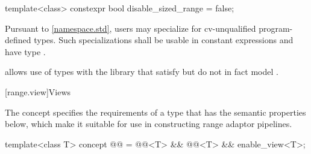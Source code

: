 %
\begin{itemdecl}
template<class>
  constexpr bool disable_sized_range = false;
\end{itemdecl}

\begin{itemdescr}
\pnum
\remarks
Pursuant to \ref{namespace.std},
users may specialize 
for cv-unqualified program-defined types.
Such specializations shall
be usable in constant expressions and
have type .

\pnum
\begin{note}
 allows use of  types with the library
that satisfy but do not in fact model .
\end{note}
\end{itemdescr}

[range.view]{Views}

\pnum
The  concept specifies the requirements of a  type
that has the semantic properties below,
which make it suitable for use in
constructing range adaptor pipelines.

\begin{itemdecl}
template<class T>
  concept @@ =
    @@<T> && @@<T> && enable_view<T>;
\end{itemdecl}

